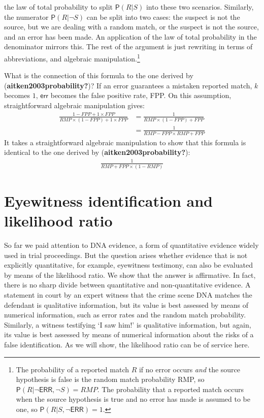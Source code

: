 \documentclass[
  letterpaper,
  DIV=11,
  numbers=noendperiod]{scrartcl}
\newcommand{\n}{\neg}
\newcommand{\pr}[1]{\mathsf{P}(#1)}
\begin{document}
the law of total probability to split \(\pr{R\vert S}\) into these two
scenarios. Similarly, the numerator \(\pr{R\vert \n S}\) can be split
into two cases: the suspect is not the source, but we are dealing with a
random match, or the suspect is not the source, and an error has been
made. An application of the law of total probability in the denominator
mirrors this. The rest of the argument is just rewriting in terms of
abbreviations, and algebraic manipulation.\footnote{The probability of a
  reported match \(R\) if no error occurs \textit{and} the source
  hypothesis is false is the random match probability RMP, so
  \(\pr{R \vert \n \mathsf{ERR}, \n S}=RMP\). The probability that a
  reported match occurs when the source hypothesis is true and no error
  has made is assumed to be one, so
  \(\pr{R \vert S, \n \mathsf{ERR}} =1\).}

What is the connection of this formula to the one derived by
(\textbf{aitken2003probability?})? If an error guarantees a mistaken
reported match, \(k\) becomes \(1\), \(\mathsf{err}\) becomes the false
positive rate, FPP. On this assumption, straightforward algebraic
manipulation gives: \begin{align*}
 \frac{1-FPP+ 1\times FPP}{RMP\times (1-FPP)+1\times FPP} & = \frac{1}{RMP \times (1-FPP)+FPP}\\
 & = \frac{1}{RMP - FPP\times RMP + FPP} 
\end{align*} \noindent   It takes a straightforward algebraic
manipulation to show that this formula is identical to the one derived
by (\textbf{aitken2003probability?}): \begin{align*}
\frac{1}{RMP + FPP \times (1-RMP)} 
\end{align*}

\hypertarget{eyewitness-identification-and-likelihood-ratio}{%
\section{\texorpdfstring{Eyewitness identification and likelihood ratio
\label{sec:eyewitness}}{Eyewitness identification and likelihood ratio }}\label{eyewitness-identification-and-likelihood-ratio}}

So far we paid attention to DNA evidence, a form of quantitative
evidence widely used in trial proceedings. But the question arises
whether evidence that is not explicitly quantitative, for example,
eyewitness testimony, can also be evaluated by means of the likelihood
ratio. We show that the answer is affirmative. In fact, there is no
sharp divide between quantitative and non-quantitative evidence. A
statement in court by an expert witness that the crime scene DNA matches
the defendant is qualitative information, but its value is best assessed
by means of numerical information, such as error rates and the random
match probability. Similarly, a witness testifying `I saw him!' is
qualitative information, but again, its value is best assessed by means
of numerical information about the risks of a false identification. As
we will show, the likelihood ratio can be of service here.
\end{document}
